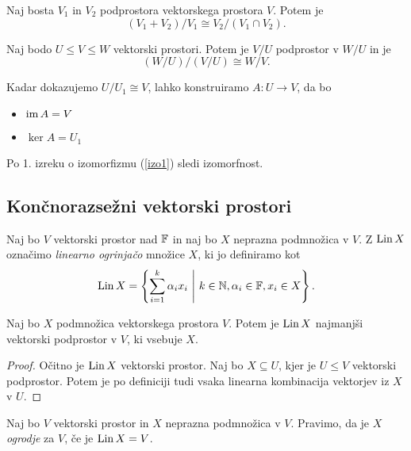\documentclass[12pt, a4paper]{article}
\begin{document}
\begin{izrek}\label{izo2}
Naj bosta $V_1$ in $V_2$ podprostora vektorskega prostora $V$. Potem je
\[
(V_1+V_2)/V_1\cong V_2/(V_1\cap V_2).
\]
\end{izrek}
\begin{izrek}\label{izo3}
Naj bodo $U\leq V\leq W$ vektorski prostori. Potem je $V/U$ podprostor v $W/U$ in je
\[
(W/U)/(V/U)\cong W/V.
\]
\end{izrek}

\begin{opomba}
Kadar dokazujemo $U/U_1\cong V$, lahko konstruiramo $A\colon U\to V$, da bo

\begin{itemize}
\item $\operatorname{im} A=V$
\item $\ker A=U_1$
\end{itemize}

Po 1. izreku o izomorfizmu (\ref{izo1}) sledi izomorfnost.
\end{opomba}

\newpage

\subsection{Končnorazsežni vektorski prostori}

\begin{definicija}
Naj bo $V$ vektorski prostor nad $\mathbb{F}$ in naj bo $X$ neprazna podmnožica v $V$. Z $\operatorname{Lin} X$ označimo \emph{linearno ogrinjačo} množice $X$, ki jo definiramo kot
\[
\operatorname{Lin} X=\left\{\sum_{i=1}^k \alpha_ix_i~\middle\vert~k\in\mathbb{N},\alpha_i\in\mathbb{F},x_i\in X\right\}.
\]
\end{definicija}

\begin{trditev}
Naj bo $X$ podmnožica vektorskega prostora $V$. Potem je $\operatorname{Lin} X$ najmanjši vektorski podprostor v $V$, ki vsebuje $X$.
\end{trditev}

\begin{proof}
Očitno je $\operatorname{Lin} X$ vektorski prostor. Naj bo $X\subseteq U$, kjer je $U\leq V$ vektorski podprostor. Potem je po definiciji tudi vsaka linearna kombinacija vektorjev iz $X$ v $U$.
\end{proof}

\begin{definicija}
Naj bo $V$ vektorski prostor in $X$ neprazna podmnožica v $V$. Pravimo, da je $X$ \emph{ogrodje} za $V$, če je $\operatorname{Lin} X=V$.
\end{definicija}
\end{document}
